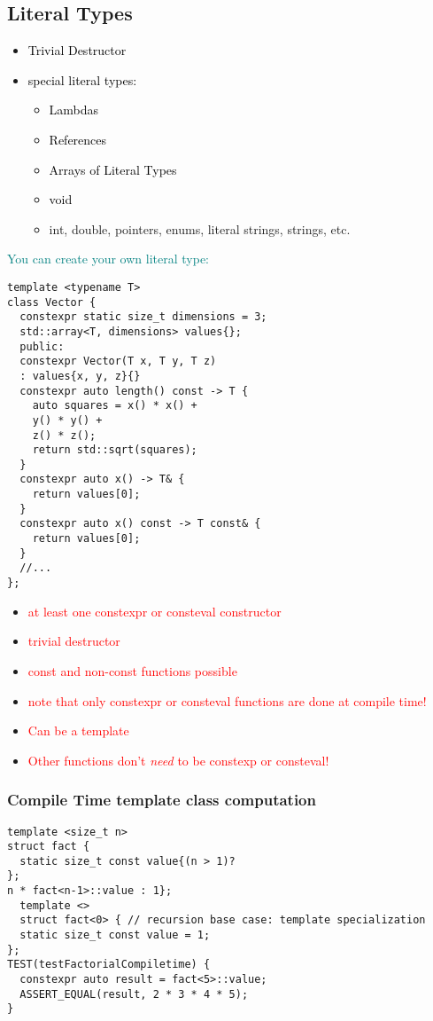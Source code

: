 \documentclass[main.tex,fontsize=8pt,paper=a4,paper=portrait,DIV=calc,]{scrartcl}
\begin{document}
\subsection{Literal Types}
\begin{itemize}
\item \textcolor{black}{Trivial Destructor}
\item \textcolor{black}{special literal types:}\newline
  \begin{itemize}
  \item \textcolor{black}{Lambdas}
  \item \textcolor{black}{References}
  \item \textcolor{black}{Arrays of Literal Types}
  \item \textcolor{black}{void}
  \item int, double, pointers, enums, literal strings, strings, etc.
  \end{itemize} 
\end{itemize} 
\textcolor{teal}{You can create your own literal type:}
\begin{lstlisting}
template <typename T>
class Vector {
  constexpr static size_t dimensions = 3;
  std::array<T, dimensions> values{};
  public:
  constexpr Vector(T x, T y, T z)
  : values{x, y, z}{}
  constexpr auto length() const -> T {
    auto squares = x() * x() +
    y() * y() +
    z() * z();
    return std::sqrt(squares);
  }
  constexpr auto x() -> T& {
    return values[0];
  }
  constexpr auto x() const -> T const& {
    return values[0];
  }
  //...
};
\end{lstlisting}
\begin{itemize}
\item \textcolor{red}{at least one constexpr or consteval constructor}
\item \textcolor{red}{trivial destructor}
\item \textcolor{red}{const and non-const functions possible}
\item \textcolor{red}{note that only constexpr or consteval functions are done at compile time!}
\item \textcolor{red}{Can be a template}
\item \textcolor{red}{Other functions don't \emph{need} to be constexp or consteval!}
\end{itemize} 

\subsubsection{Compile Time template class computation}
\begin{lstlisting}
template <size_t n>
struct fact {
  static size_t const value{(n > 1)?
};
n * fact<n-1>::value : 1};
  template <>
  struct fact<0> { // recursion base case: template specialization
  static size_t const value = 1;
};
TEST(testFactorialCompiletime) {
  constexpr auto result = fact<5>::value;
  ASSERT_EQUAL(result, 2 * 3 * 4 * 5);
}
\end{lstlisting}
\end{document}
